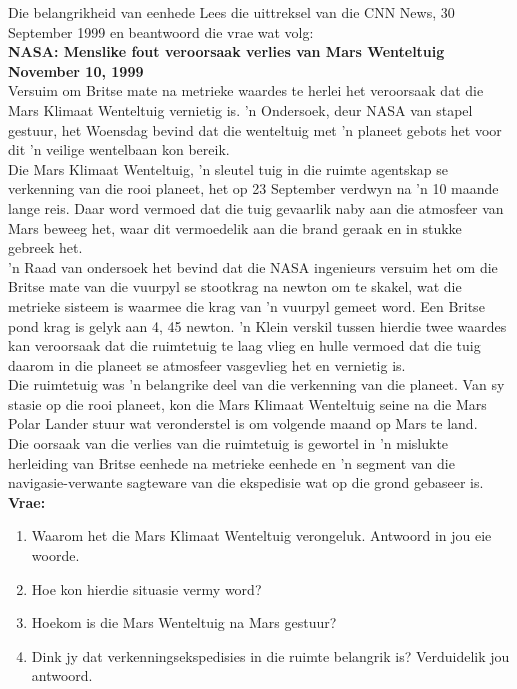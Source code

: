 \begin{casestudy}{Die belangrikheid van eenhede}
            \nopagebreak
Lees die uittreksel van die CNN News, 30 September 1999 en beantwoord die vrae wat volg:\\
\textbf{NASA: Menslike fout veroorsaak verlies van Mars Wenteltuig November 10, 1999}\\
Versuim om Britse mate na metrieke waardes te herlei het veroorsaak dat die Mars Klimaat Wenteltuig vernietig is.  'n Ondersoek, deur NASA van stapel gestuur, het Woensdag bevind dat die wenteltuig met  'n planeet gebots het voor dit  'n veilige wentelbaan kon bereik.\\
Die Mars Klimaat Wenteltuig,  'n sleutel tuig in die ruimte agentskap se verkenning van die rooi planeet, het op 23 September verdwyn na  'n 10 maande lange reis. Daar word vermoed dat die tuig gevaarlik naby aan die atmosfeer van Mars beweeg het, waar dit vermoedelik aan die brand geraak en in stukke gebreek het.\\
 'n Raad van ondersoek het bevind dat die NASA ingenieurs versuim het om die Britse mate van die vuurpyl se stootkrag na newton om te skakel, wat die metrieke sisteem is waarmee die krag van  'n vuurpyl gemeet word. Een Britse pond krag is gelyk aan 4, 45 newton.  'n Klein verskil tussen hierdie twee waardes kan veroorsaak dat die ruimtetuig te laag vlieg en hulle vermoed dat die tuig daarom in die planeet se atmosfeer vasgevlieg het en vernietig is.\\
Die ruimtetuig was  'n belangrike deel van die verkenning van die planeet. Van sy stasie op die rooi planeet, kon die Mars Klimaat Wenteltuig seine na die Mars Polar Lander stuur wat veronderstel is om volgende maand op Mars te land.\\
Die oorsaak van die verlies van die ruimtetuig is gewortel in  'n mislukte herleiding van Britse eenhede na metrieke eenhede en  'n segment van die navigasie-verwante sagteware van die ekspedisie wat op die grond gebaseer is.\\
\textbf{Vrae:}\\
\begin{enumerate}[noitemsep, label=\textbf{\arabic*}. ] 
\item Waarom het die Mars Klimaat Wenteltuig verongeluk. Antwoord in  jou eie woorde.
\item Hoe kon hierdie situasie vermy word?
\item Hoekom is die Mars Wenteltuig na Mars gestuur?
\item Dink jy dat verkenningsekspedisies in die ruimte belangrik is? Verduidelik jou antwoord.
\end{enumerate}
\end{casestudy}
